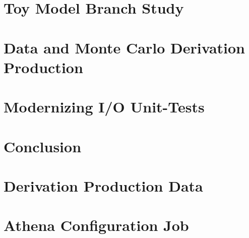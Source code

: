 \documentclass[12pt]{niuthesis}
\begin{document}
\chapter{Toy Model Branch Study}
\label{chap:Toy_Model}


\chapter{Data and Monte Carlo Derivation Production}
\label{chap:DAODProd}


\chapter{Modernizing I/O Unit-Tests}
\label{chap:Modernize}


\chapter{Conclusion}




\printbibliography

\clearpage
\appendix

% 

\chapter{Derivation Production Data}


\chapter{Athena Configuration Job} \label{app:athena-job-config}

\end{document}
